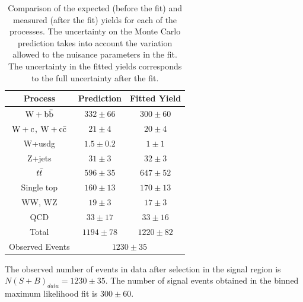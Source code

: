 \begin{table}[htb]
\begin{center}
\begin{tabular}{c c c }
\hline 
Process  & Prediction  & Fitted Yield \\
\hline 
$\mathrm{W+\mathrm{b\bar{b}}}$         & $332\pm66$     & $300\pm60$ \\
$\mathrm{W+c}$, $\mathrm{W+\mathrm{c\bar{c}}}$  & $21\pm4$       & $20\pm4$ \\
W+usdg         & $1.5\pm0.2$    & $1\pm1$  \\
Z+jets         & $31\pm3$       & $32\pm3$ \\   
$t\bar{t}$       & $596\pm35$     & $647\pm52$ \\  
Single top     & $160\pm13$     & $170\pm13$ \\
WW, WZ         & $19\pm3$       & $17\pm3$   \\
QCD            & $33\pm17$      & $33\pm16$  \\
\hline
Total          & $1194\pm78$    & $1220\pm82$ \\ 
\hline 
\hline
Observed Events & \multicolumn{2}{c}{$1230\pm35 $} \\
\hline 
\end{tabular}
\caption{Comparison of the expected (before the fit) and measured (after the fit) yields for each of the processes. The uncertainty on
the Monte Carlo prediction takes into account the variation allowed to the nuisance parameters in the fit. The uncertainty in the fitted yields
corresponds to the full uncertainty after the fit.
}
\label{tab:fitYields}
\end{center}
\end{table}

The observed number of events in data after selection in the signal region is $N(S+B)_{data}=1230\pm35 $. 
The number of signal events obtained in the binned maximum likelihood fit is $300\pm60$. 

